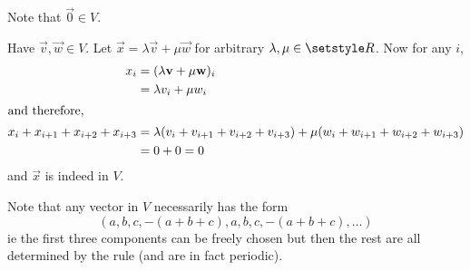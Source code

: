 \documentclass[fleqn,a4paper,11pt]{article}
\begin{document}
\begin{enumerate}[label=\textbf{\arabic*.}]
    Note that \(\vec 0 \in V\).

    Have \(\vec v, \vec w \in V\). Let \(\vec x = \lambda \vec v + \mu \vec w\)
    for arbitrary \(\lambda, \mu \in \Reals\). Now for any \(i\),
    \begin{align*}
     x_i &= (\lambda \vec v + \mu \vec w)_i \\
         &= \lambda v_i + \mu w_i \\
     \intertext{and therefore,}
     x_i + x_{i + 1} + x_{i + 2} + x_{i + 3} &=
      \lambda(v_i + v_{i + 1} + v_{i + 2} + v_{i + 3}) +
      \mu(w_i + w_{i + 1} + w_{i + 2} + w_{i + 3}) \\
      &= 0 + 0 = 0
    \end{align*}
    and \(\vec x\) is indeed in \(V\).

    Note that any vector in \(V\) necessarily has the form
    \begin{equation*}
     (a, b, c, -(a + b + c), a, b, c, -(a + b + c), \dotsc)
    \end{equation*}
    ie the first three components can be freely chosen but then the rest are all
    determined by the rule (and are in fact periodic).


\end{enumerate}
\end{document}
